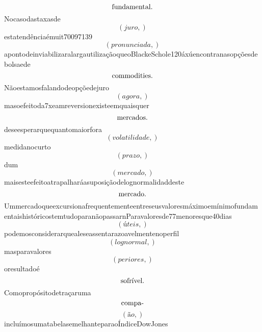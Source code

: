 \documentclass{article}
\begin{document}
\begin{equation}
$fundamental.$
\end{equation}Nocasodastaxasde\begin{equation}
\left( juro,\right)
\end{equation}estatendênciaémuit70097139\begin{equation}
\left( pronunciada,\right)
\end{equation}apontodeinviabilizaralargautilizaçãoqueoBlackeSchole120áxúencontranasopçõesdebolsaede\begin{equation}
$commodities.$
\end{equation}Nãoestamosfalandodeopçõedejuro\begin{equation}
\left( agora,\right)
\end{equation}masoefeitoda7xeamreversionexisteemquaisquer\begin{equation}
$mercados.$
\end{equation}deseesperarquequantomaiorfora\begin{equation}
\left( volatilidade,\right)
\end{equation}medidanocurto\begin{equation}
\left( prazo,\right)
\end{equation}dum\begin{equation}
\left( mercado,\right)
\end{equation}maisesteefeitoatrapalharáasuposiçãodelognormalidaddeste\begin{equation}
$mercado.$
\end{equation}UmmercadoqueexcursionafrequentementeentreseusvaloresmáximoemínimofundamentaishistóricostemtudoparanãopassarnParavaloresde77menoresque40dias\begin{equation}
\left( úteis,\right)
\end{equation}podemosconsiderarquealeseassentarazoavelmentenoperfil\begin{equation}
\left( lognormal,\right)
\end{equation}masparavalores\begin{equation}
\left( periores,\right)
\end{equation}oresultadoé\begin{equation}
$sofrível.$
\end{equation}Comopropósitodetraçaruma\begin{equation}
$compa-$
\end{equation}\begin{equation}
\left( ão,\right)
\end{equation}incluímosumatabelasemelhanteparaoÍndiceDowJones\begin{equation}

\end{equation}
\end{document}
